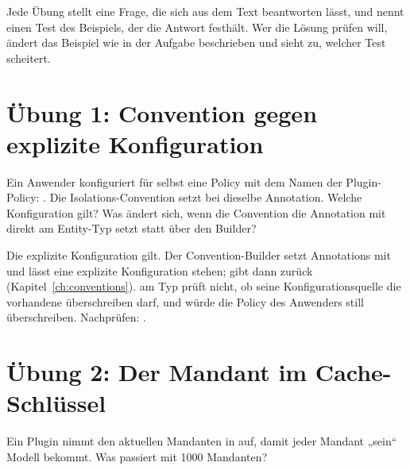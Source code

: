Jede Übung stellt eine Frage, die sich aus dem Text beantworten lässt, und nennt einen Test des
Beispiels, der die Antwort festhält. Wer die Lösung prüfen will, ändert das Beispiel wie in der
Aufgabe beschrieben und sieht zu, welcher Test scheitert.

\section{Übung 1: Convention gegen explizite Konfiguration}

Ein Anwender konfiguriert für  selbst eine Policy mit dem Namen der
Plugin-Policy: . Die
Isolations-Convention setzt bei  dieselbe Annotation. Welche
Konfiguration gilt? Was ändert sich, wenn die Convention die Annotation mit
 direkt am Entity-Typ setzt statt über den Builder?

\begin{note}[Lösung]
  Die explizite Konfiguration gilt. Der Convention-Builder setzt Annotations mit
   und lässt eine explizite
  Konfiguration stehen;  gibt dann  zurück
  (Kapitel~\ref{ch:conventions}).  am Typ prüft nicht, ob
  seine Konfigurationsquelle die vorhandene überschreiben darf, und würde die Policy des Anwenders still überschreiben.
  Nachprüfen: .
\end{note}

\section{Übung 2: Der Mandant im Cache-Schlüssel}

Ein Plugin nimmt den aktuellen Mandanten in
 auf, damit
jeder Mandant „sein“ Modell bekommt. Was passiert mit 1000 Mandanten?


